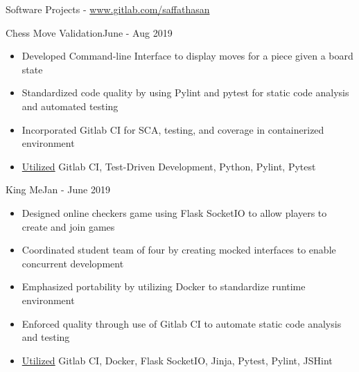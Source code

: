 \documentclass[]{mcdowellcv}
\begin{document}
	\begin{cvsection}{Software Projects - \url{www.gitlab.com/saffathasan}}
		\begin{cvsubsection}{Chess Move Validation}{}{June - Aug 2019}
			\begin{itemize}
                \item Developed Command-line Interface to display moves for a piece given a board state
                \item Standardized code quality by using Pylint and pytest for static code analysis and automated testing
                \item Incorporated Gitlab CI for SCA, testing, and coverage in containerized environment
                \item \underline{Utilized} Gitlab CI, Test-Driven Development, Python, Pylint, Pytest
			\end{itemize}
		\end{cvsubsection}
		\begin{cvsubsection}{King Me}{}{Jan - June 2019}
			\begin{itemize}
			    \item Designed online checkers game using Flask SocketIO to allow players to create and join games
			    \item Coordinated student team of four by creating mocked interfaces to enable concurrent development
                \item Emphasized portability by utilizing Docker to standardize runtime environment
                \item Enforced quality through use of Gitlab CI to automate static code analysis and testing
                \item \underline{Utilized} Gitlab CI, Docker, Flask SocketIO, Jinja, Pytest, Pylint, JSHint
			\end{itemize}
		\end{cvsubsection}
	\end{cvsection}
\end{document}

